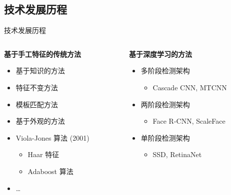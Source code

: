 \documentclass{beamer}
\begin{document}
\subsection{技术发展历程}
\begin{frame}{技术发展历程}
\begin{columns}[T]
\begin{column}{0.48\textwidth}
    \textbf{基于手工特征的传统方法}
    \begin{itemize}
        \item 基于知识的方法
        \item 特征不变方法
        \item 模板匹配方法
        \item 基于外观的方法
        \item Viola-Jones 算法 (2001)
        \begin{itemize}
            \item Haar 特征
            \item Adaboost 算法
        \end{itemize}
        \item \dots
    \end{itemize}
\end{column}

\begin{column}{0.48\textwidth}
    \textbf{基于深度学习的方法}
    \begin{itemize}
        \item 多阶段检测架构
        \begin{itemize}
            \item Cascade CNN, MTCNN
        \end{itemize}
        \item 两阶段检测架构
        \begin{itemize}
            \item Face R-CNN, ScaleFace
        \end{itemize}
        \item 单阶段检测架构
        \begin{itemize}
            \item SSD, RetinaNet
        \end{itemize}
    \end{itemize}
\end{column}
\end{columns}
\end{frame}

\end{document}
